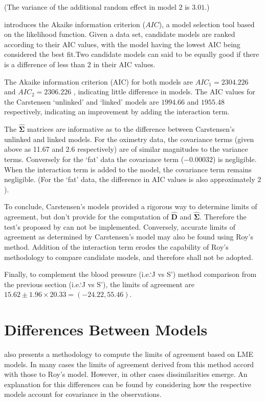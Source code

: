 \documentclass[12pt, a4paper]{report}
\theoremstyle{plain}
\theoremstyle{definition}
\theoremstyle{remark}
\begin{document}
	\noindent (The variance of the additional random effect in model $2$ is $3.01$.)
	
	\citet{akaike} introduces the Akaike information criterion ($AIC$), a model 
	selection tool based on the likelihood function. Given a data set, candidate models
	are ranked according to their AIC values, with the model having the lowest AIC being considered the best fit.Two candidate models can said to be equally good if there is a difference of less than $2$ in their AIC values.
	
	The Akaike information criterion (AIC) for both models are $AIC_{1} = 2304.226$ and $AIC_{2} = 2306.226$ , indicating little difference in models. The AIC values for the Carstensen `unlinked' and `linked' models are $1994.66$ and $1955.48$ respectively, indicating an improvement by adding the interaction term.
	
	The $\boldsymbol{\hat{\Sigma}}$ matrices are informative as to the difference between Carstensen's unlinked and linked models. For the oximetry data, the covariance terms (given above as 11.67 and 2.6 respectively) are of similar magnitudes to the variance terms. Conversely for the `fat' data the covariance term ($-0.00032$) is negligible. When the interaction term is added to the model, the covariance term remains negligible. (For the `fat' data, the difference in AIC values is also approximately $2$).
	
	To conclude, Carstensen's models provided a rigorous way to determine limits of agreement, but don't provide for the computation of $\boldsymbol{\hat{D}}$ and $\boldsymbol{\hat{\Sigma}}$. Therefore the test's proposed by \citet{ARoy2009} can not be implemented. Conversely, accurate limits of agreement as determined by Carstensen's model may also be found using Roy's method. Addition of the interaction term erodes the capability of Roy's methodology to compare candidate models, and therefore shall not be adopted.
	
	Finally, to complement the blood pressure (i.e.`J vs S') method comparison from the previous section (i.e.`J vs S'), the limits of agreement are $15.62 \pm 1.96 \times 20.33 = (-24.22, 55.46)$.
	
	
	
	
	\section{Differences Between Models}
	
	\citet{BXC2008} also presents a methodology to compute the limits of agreement based on LME models. In many cases the limits of agreement derived from this method accord with those to Roy's model. However, in other cases dissimilarities emerge. An explanation for this differences can be found by considering how the respective models account for covariance in the observations. 
	
\end{document}
